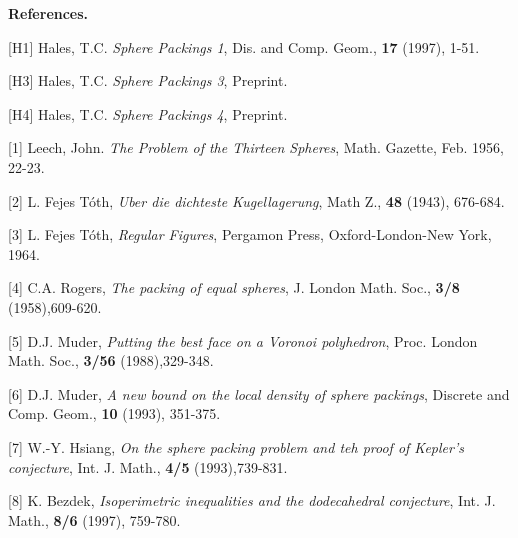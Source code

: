 \def\today{\ifcase\month\or
    January\or February\or March\or April\or May\or June\or
    July\or August\or September\or October\or November\or December\fi
    \space\number\day, \number\year}


{\bf References.}

[H1] Hales, T.C. {\it Sphere Packings 1}, Dis. and Comp. Geom., 
{\bf 17} (1997), 1-51.

[H3] Hales, T.C. {\it Sphere Packings 3}, Preprint.

[H4] Hales, T.C. {\it Sphere Packings 4}, Preprint.

[1] Leech, John.  {\it The Problem of the Thirteen Spheres},  Math. Gazette,  
Feb. 1956, 22-23.

[2] L. Fejes T\'oth, {\it Uber die dichteste Kugellagerung}, Math 
Z., {\bf 48} (1943), 676-684.

[3] L. Fejes T\'oth, {\it Regular Figures}, Pergamon Press, Oxford-London-New York, 1964.


[4] C.A. Rogers, {\it The packing of equal spheres}, J. London Math. Soc.,
{\bf 3/8} (1958),609-620.

[5] D.J. Muder, {\it Putting the best face on a Voronoi polyhedron}, 
Proc. London Math. Soc., {\bf 3/56} (1988),329-348.

[6] D.J. Muder, {\it A new bound on the local density of sphere packings}, 
Discrete and Comp. Geom., {\bf 10} (1993), 351-375.

[7] W.-Y. Hsiang, {\it On the sphere packing problem and teh proof of Kepler's conjecture},
Int. J. Math., {\bf 4/5} (1993),739-831.

[8] K. Bezdek, {\it Isoperimetric inequalities and the dodecahedral conjecture}, Int. J. Math.,
{\bf 8/6} (1997), 759-780.

